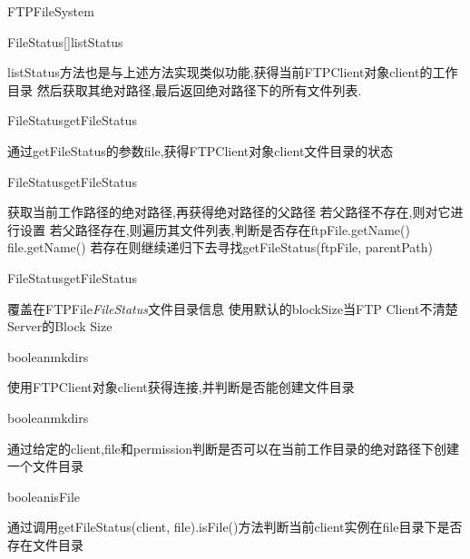 \begin{XeClass}{FTPFileSystem}
    \begin{XeMethod}{\XePrivate}{FileStatus[]}{listStatus}
         
 listStatus方法也是与上述方法实现类似功能,获得当前FTPClient对象client的工作目录
 然后获取其绝对路径,最后返回绝对路径下的所有文件列表.

    \end{XeMethod}

    \begin{XeMethod}{\XePublic}{FileStatus}{getFileStatus}
         
 通过getFileStatus的参数file,获得FTPClient对象client文件目录的状态

    \end{XeMethod}

    \begin{XeMethod}{\XePrivate}{FileStatus}{getFileStatus}
         
 获取当前工作路径的绝对路径,再获得绝对路径的父路径
 若父路径不存在,则对它进行设置
 若父路径存在,则遍历其文件列表,判断是否存在ftpFile.getName()  file.getName()
 若存在则继续递归下去寻找getFileStatus(ftpFile, parentPath)

    \end{XeMethod}

    \begin{XeMethod}{\XePrivate}{FileStatus}{getFileStatus}
         
 覆盖在FTPFile\emph{FileStatus}文件目录信息
 使用默认的blockSize当FTP Client不清楚Server的Block Size

    \end{XeMethod}

    \begin{XeMethod}{\XePublic}{boolean}{mkdirs}
         
 使用FTPClient对象client获得连接,并判断是否能创建文件目录

    \end{XeMethod}

    \begin{XeMethod}{\XePrivate}{boolean}{mkdirs}
         
 通过给定的client,file和permission判断是否可以在当前工作目录的绝对路径下创建一个文件目录

    \end{XeMethod}

    \begin{XeMethod}{\XePrivate}{boolean}{isFile}
         
 通过调用getFileStatus(client, file).isFile()方法判断当前client实例在file目录下是否存在文件目录


\end{XeMethod}
\end{XeClass}
